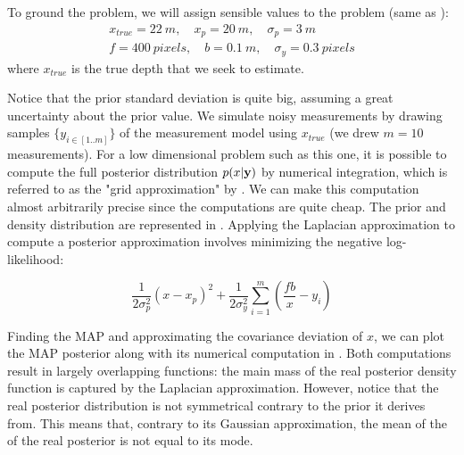 To ground the problem, we will assign sensible values to the problem (same as \cite{barfoot2017state}):
%
\begin{gather*}
    x_{true} = 22~m, \quad x_p = 20~m, \quad \sigma_p = 3~m \\
    f = 400~pixels, \quad b = 0.1~m, \quad \sigma_y = 0.3~pixels   
\end{gather*}
%
where $x_{true}$ is the true depth that we seek to estimate.

Notice that the prior standard deviation is quite big, assuming a great uncertainty about the prior value. We simulate noisy measurements by drawing samples 
$\{y_{i \in [1..m]}\}$ of the measurement model using $x_{true}$ (we drew $m=10$ measurements). For a low dimensional problem such as this one, 
it is possible to compute the full posterior distribution $p(x|{\bf y})$ by numerical integration, which is referred to as the "grid approximation" by 
\cite{mcelreath2018statistical}. We can make this computation almost arbitrarily precise since the computations are quite cheap. The prior and density distribution are represented in . Applying the Laplacian approximation to
compute a posterior approximation involves minimizing the negative log-likelihood:

\begin{equation}
    \frac{1}{2 \sigma_p^2}(x - x_p)^2 + \frac{1}{2\sigma_y^2} \sum_{i=1}^m (\frac{fb}{x} - y_i)
\end{equation}

Finding the MAP and approximating the covariance deviation of $x$, we can plot the MAP posterior along with its numerical computation in . 
Both computations result in largely overlapping functions: the main mass of the real posterior density function is captured by the Laplacian approximation.
However, notice that the real posterior distribution is not symmetrical contrary to the prior it derives from. This means that, contrary to its Gaussian approximation, the mean of the
of the real posterior is not equal to its mode. 

